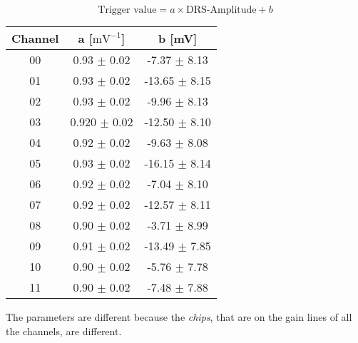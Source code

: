 \begin{frame} [fragile]
\begin{equation*}
\text{Trigger value} =  a \times \text{DRS-Amplitude} + b
\end{equation*}

\begin{center}
\begin{tabular}{ ccc } 
 \hline
\textbf{Channel} & a  [$\text{mV}^{-1}$]& b [mV] \\ 
 \hline
 \hline
00 & 0.93     $\pm$ 0.02 & -7.37   $\pm$ 8.13 \\ 
01 & 0.93     $\pm$ 0.02 & -13.65 $\pm$ 8.15 \\
02 & 0.93     $\pm$ 0.02 & -9.96   $\pm$ 8.13 \\
03 & 0.920   $\pm$ 0.02 & -12.50 $\pm$ 8.10 \\
04 & 0.92     $\pm$ 0.02 & -9.63   $\pm$ 8.08 \\
05 & 0.93     $\pm$ 0.02 & -16.15 $\pm$ 8.14 \\
06 & 0.92     $\pm$ 0.02 & -7.04   $\pm$ 8.10 \\
07 & 0.92     $\pm$ 0.02 & -12.57 $\pm$ 8.11 \\
08 & 0.90     $\pm$ 0.02 & -3.71   $\pm$ 8.99 \\
09 & 0.91     $\pm$ 0.02 & -13.49 $\pm$ 7.85 \\
10 & 0.90     $\pm$ 0.02 & -5.76   $\pm$ 7.78 \\
11 & 0.90     $\pm$ 0.02 & -7.48   $\pm$ 7.88 \\
  \hline
  \hline
\end{tabular}
\end{center}
The parameters are different because the \textit{chips}, that are on the gain lines of all the channels, are different.
\end{frame}

